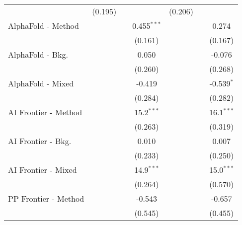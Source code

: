 \begin{tabular}{lcccccc}
                                  & (0.195)        &                &                & (0.206)        &                &   \\   
   AlphaFold - Method             &                &                & 0.455$^{***}$  &                &                & 0.274\\   
                                  &                &                & (0.161)        &                &                & (0.167)\\   
   AlphaFold - Bkg.               &                &                & 0.050          &                &                & -0.076\\   
                                  &                &                & (0.260)        &                &                & (0.268)\\   
   AlphaFold - Mixed              &                &                & -0.419         &                &                & -0.539$^{*}$\\   
                                  &                &                & (0.284)        &                &                & (0.282)\\   
   AI Frontier - Method           &                &                & 15.2$^{***}$   &                &                & 16.1$^{***}$\\   
                                  &                &                & (0.263)        &                &                & (0.319)\\   
   AI Frontier - Bkg.             &                &                & 0.010          &                &                & 0.007\\   
                                  &                &                & (0.233)        &                &                & (0.250)\\   
   AI Frontier - Mixed            &                &                & 14.9$^{***}$   &                &                & 15.0$^{***}$\\   
                                  &                &                & (0.264)        &                &                & (0.570)\\   
   PP Frontier - Method           &                &                & -0.543         &                &                & -0.657\\   
                                  &                &                & (0.545)        &                &                & (0.455)\\   

\end{tabular}
